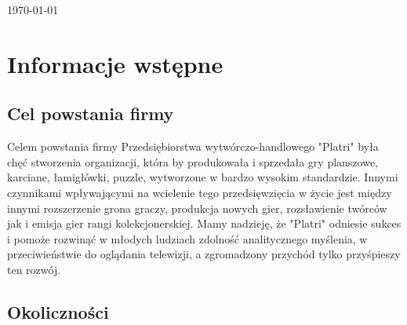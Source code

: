 \documentclass[a4paper, 11pt]{article}
\begin{document}
\begin{titlepage}
		
		
		{\large \today}\\[3cm] %
		
		
		
		
		\vfill %
		
	\end{titlepage}
	
	
	\tableofcontents
	\vfill

	\newpage
	\section{Informacje wstępne}

	\subsection{Cel powstania firmy}
	\indent

Celem powstania firmy Przedsiębiorstwa wytwórczo-handlowego "Platri" była chęć stworzenia organizacji, która by produkowała i sprzedała gry planszowe, karciane, łamigłówki, puzzle, wytworzone w bardzo wysokim standardzie. Innymi czynnikami wpływającymi na wcielenie tego przedsięwzięcia w życie jest między innymi rozszerzenie grona graczy, produkcja nowych gier, rozsławienie twórców jak i emisja gier rangi kolekcjonerskiej. Mamy nadzieję, że "Platri" odniesie sukces i pomoże rozwinąć w młodych ludziach zdolność analitycznego myślenia, w przeciwieństwie do oglądania telewizji, a zgromadzony przychód tylko przyśpieszy ten rozwój.

	\subsection{Okoliczności} 
	\indent
		
\end{document}
